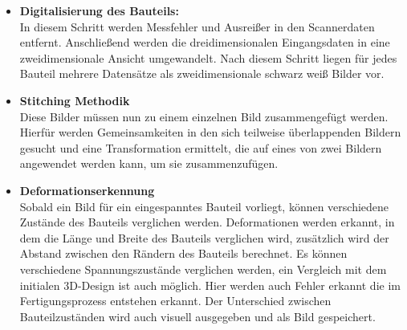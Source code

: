 \begin{itemize}
    \item \textbf{Digitalisierung des Bauteils:}\\
        In diesem Schritt werden Messfehler und Ausreißer
        in den Scannerdaten entfernt. Anschließend werden die dreidimensionalen 
        Eingangsdaten in eine zweidimensionale Ansicht umgewandelt.
        Nach diesem Schritt liegen für jedes Bauteil mehrere Datensätze als 
        zweidimensionale schwarz weiß Bilder vor.
    \item \textbf{Stitching Methodik}\\
        Diese Bilder müssen nun zu einem einzelnen Bild zusammengefügt werden.
        Hierfür werden Gemeinsamkeiten in den sich 
        teilweise überlappenden Bildern gesucht und eine Transformation ermittelt,
        die auf eines von zwei Bildern angewendet werden kann, um sie zusammenzufügen.
    \item \textbf{Deformationserkennung}\\
        Sobald ein Bild für ein eingespanntes Bauteil vorliegt, können verschiedene 
        Zustände des Bauteils verglichen werden. Deformationen werden erkannt, in dem 
        die Länge und Breite des Bauteils verglichen wird, zusätzlich wird der 
        Abstand zwischen den Rändern des Bauteils berechnet. Es können verschiedene
        Spannungszustände verglichen werden, ein Vergleich mit dem initialen 
        3D-Design ist auch möglich. Hier werden auch Fehler erkannt die im 
        Fertigungsprozess entstehen erkannt. Der Unterschied zwischen Bauteilzuständen
        wird auch visuell ausgegeben und als Bild gespeichert.
        
\end{itemize}

























